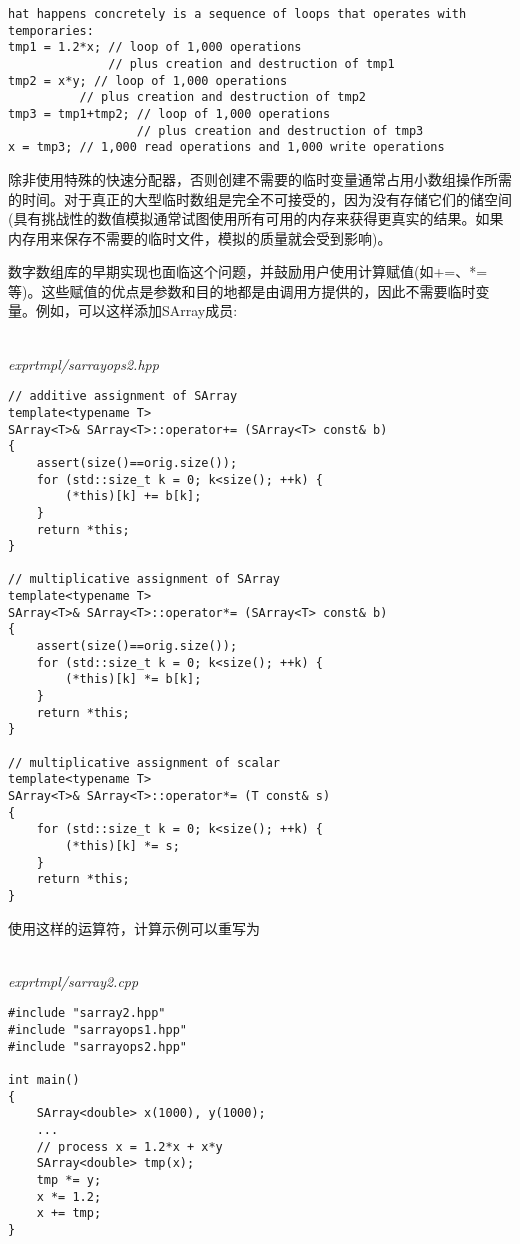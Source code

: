 \begin{lstlisting}[style=styleCXX]
hat happens concretely is a sequence of loops that operates with temporaries:
tmp1 = 1.2*x; // loop of 1,000 operations
			  // plus creation and destruction of tmp1
tmp2 = x*y; // loop of 1,000 operations
		  // plus creation and destruction of tmp2
tmp3 = tmp1+tmp2; // loop of 1,000 operations
				  // plus creation and destruction of tmp3
x = tmp3; // 1,000 read operations and 1,000 write operations
\end{lstlisting}

除非使用特殊的快速分配器，否则创建不需要的临时变量通常占用小数组操作所需的时间。对于真正的大型临时数组是完全不可接受的，因为没有存储它们的储空间(具有挑战性的数值模拟通常试图使用所有可用的内存来获得更真实的结果。如果内存用来保存不需要的临时文件，模拟的质量就会受到影响)。

数字数组库的早期实现也面临这个问题，并鼓励用户使用计算赋值(如+=、*=等)。这些赋值的优点是参数和目的地都是由调用方提供的，因此不需要临时变量。例如，可以这样添加SArray成员:

\hspace*{\fill} \\ %
\noindent
\textit{exprtmpl/sarrayops2.hpp}
\begin{lstlisting}[style=styleCXX]
// additive assignment of SArray
template<typename T>
SArray<T>& SArray<T>::operator+= (SArray<T> const& b)
{
	assert(size()==orig.size());
	for (std::size_t k = 0; k<size(); ++k) {
		(*this)[k] += b[k];
	}
	return *this;
}

// multiplicative assignment of SArray
template<typename T>
SArray<T>& SArray<T>::operator*= (SArray<T> const& b)
{
	assert(size()==orig.size());
	for (std::size_t k = 0; k<size(); ++k) {
		(*this)[k] *= b[k];
	}
	return *this;
}

// multiplicative assignment of scalar
template<typename T>
SArray<T>& SArray<T>::operator*= (T const& s)
{
	for (std::size_t k = 0; k<size(); ++k) {
		(*this)[k] *= s;
	}
	return *this;
}
\end{lstlisting}

使用这样的运算符，计算示例可以重写为

\hspace*{\fill} \\ %
\noindent
\textit{exprtmpl/sarray2.cpp}
\begin{lstlisting}[style=styleCXX]
#include "sarray2.hpp"
#include "sarrayops1.hpp"
#include "sarrayops2.hpp"

int main()
{
	SArray<double> x(1000), y(1000);
	...
	// process x = 1.2*x + x*y
	SArray<double> tmp(x);
	tmp *= y;
	x *= 1.2;
	x += tmp;
}
\end{lstlisting}

